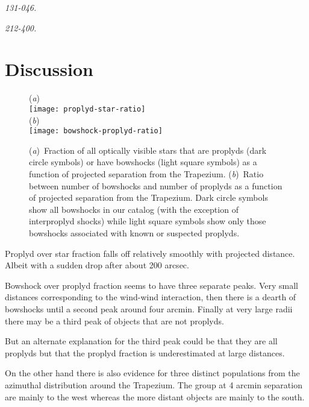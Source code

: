 \documentclass[iop, apj]{emulateapj}
\begin{document}
\textit{131-046.} 

\textit{212-400.}


\clearpage
\section{Discussion}
\label{sec:discuss}
\begin{figure}
  (\textit{a})\\
  \texttt{[image: proplyd-star-ratio]}\\
  (\textit{b})\\
  \texttt{[image: bowshock-proplyd-ratio]}
  \caption{(\textit{a})~Fraction of all optically visible stars that
    are proplyds (dark circle symbols) or have bowshocks (light square
    symbols) as a function of projected separation from the Trapezium.
    (\textit{b})~Ratio between number of bowshocks and number of
    proplyds as a function of projected separation from the Trapezium.
    Dark circle symbols show all bowshocks in our catalog (with the
    exception of interproplyd shocks) while light square symbols show
    only those bowshocks associated with known or suspected proplyds.
  }
  \label{fig:bow-proplyd-star-ratios}
\end{figure}

Proplyd over star fraction falls off relatively smoothly with projected distance.  Albeit with a sudden drop after about 200 arcsec.


Bowshock over proplyd fraction seems to have three separate peaks.   Very small distances corresponding to the wind-wind interaction, then there is a dearth of bowshocks until a second peak around four arcmin.  Finally at very large radii there may be a third peak of objects that are not proplyds.

But an alternate explanation for the third peak could be that they are all proplyds but that the proplyd fraction is underestimated at large distances.

On the other hand there is also evidence for three distinct populations from the azimuthal distribution around the Trapezium.  The group at 4 arcmin separation are mainly to the west whereas the more distant objects are mainly to the south.
\end{document}
